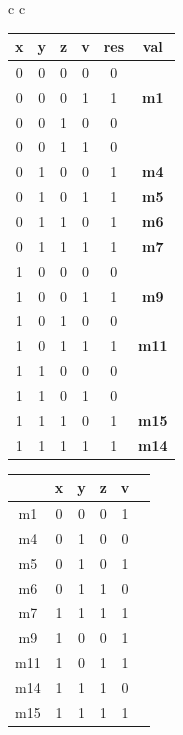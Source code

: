 \begin{center}
  
\begin{tabular}{ c c }
	
	\begin{tabular}{|c c c c|c c|}
		\hline
		x & y & z & v & res & val \\ \hline
		0 & 0 & 0 & 0 & 0 & {} \\ 
		0 & 0 & 0 & 1 & 1 & \textbf{m1} \\
		0 & 0 & 1 & 0 & 0 & {} \\
		0 & 0 & 1 & 1 & 0 & {} \\
		0 & 1 & 0 & 0 & 1 & \textbf{m4} \\
		0 & 1 & 0 & 1 & 1 & \textbf{m5} \\
		0 & 1 & 1 & 0 & 1 & \textbf{m6} \\
		0 & 1 & 1 & 1 & 1 & \textbf{m7} \\
		1 & 0 & 0 & 0 & 0 & {} \\
		1 & 0 & 0 & 1 & 1 & \textbf{m9} \\
		1 & 0 & 1 & 0 & 0 & {} \\
		1 & 0 & 1 & 1 & 1 & \textbf{m11} \\
		1 & 1 & 0 & 0 & 0 & {} \\
		1 & 1 & 0 & 1 & 0 & {} \\
		1 & 1 & 1 & 0 & 1 & \textbf{m15} \\	
		1 & 1 & 1 & 1 & 1 & \textbf{m14} \\ \hline
	\end{tabular}
	
	\quad
	\quad
	\quad
	
	\begin{tabular}{|c c c c c |c|}
		\hline
		{} & x & y & z & v & {} \\ \hline
		m1 & 0 & 0 & 0 & 1 & \checkmark \\ 
		m4 & 0 & 1 & 0 & 0 & \checkmark  \\
		m5 & 0 & 1 & 0 & 1 & \checkmark  \\
		m6 & 0 & 1 & 1 & 0 & \checkmark  \\
		m7 & 1 & 1 & 1 & 1 & \checkmark  \\
		m9 & 1 & 0 & 0 & 1 & \checkmark  \\
		m11 & 1 & 0 & 1 & 1 & \checkmark  \\
		m14 & 1 & 1 & 1 & 0 & \checkmark   \\
		m15 & 1 & 1 & 1 & 1 & \checkmark  \\ \hline
		

\end{tabular}
\end{tabular}
\end{center}
